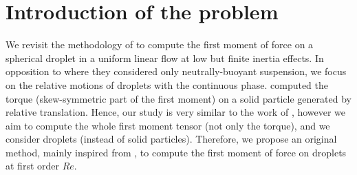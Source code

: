 \section{Introduction of the problem}


We revisit the methodology of \citet{stone2001inertial,raja2010inertial,jiang2021inertial}  to compute the first moment of force on a spherical droplet in a uniform linear flow at low but finite inertia effects. 
In opposition to \citet{stone2001inertial,raja2010inertial} where they considered only neutrally-buoyant suspension, we focus on the relative motions of droplets with the continuous phase. 
\citet{jiang2021inertial} computed the torque (skew-symmetric part of the first moment) on a solid particle generated by relative translation. 
Hence, our study is very similar to the work of \citet{jiang2021inertial}, however we aim to compute the whole first moment tensor (not only the torque), and we consider droplets (instead of solid particles). 
Therefore, we propose an original method, mainly inspired from \citet{stone2001inertial}, to compute the first moment of force on droplets at first order $Re$.  



